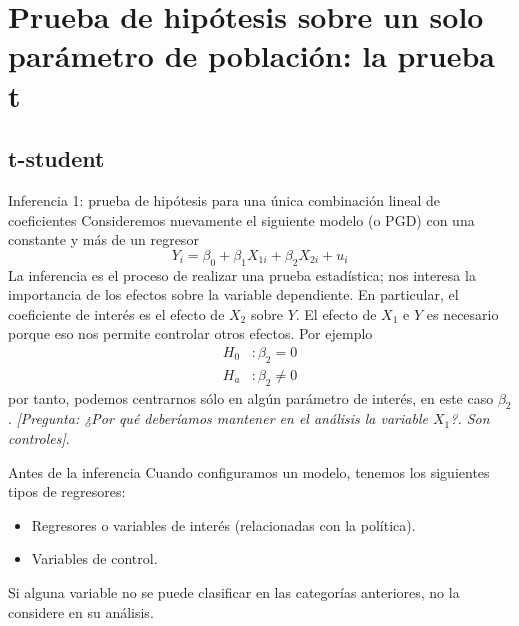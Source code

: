 \section{Prueba de hipótesis sobre un solo parámetro de población: la prueba t}

\subsection{t-student}

\begin{frame}{Inferencia 1: prueba de hipótesis para una única combinación lineal de coeficientes}
	Consideremos nuevamente el siguiente modelo (o PGD) con una constante y más de un regresor
		$$Y_i = \beta_0 + \beta_1 X_{1i} + \beta_2X_{2i} + u_i$$
	La inferencia es el proceso de realizar una prueba estadística; nos interesa la importancia de los efectos sobre la variable dependiente. En particular, el coeficiente de interés es el efecto de $X_2$ sobre $Y$. El efecto de $X_1$ e $Y$ es necesario porque eso nos permite controlar otros efectos. Por ejemplo
		\begin{align*}
			H_0 & : \beta_2 = 0\\
			H_a & : \beta_2 \neq 0
		\end{align*}
	por tanto, podemos centrarnos sólo en algún parámetro de interés, en este caso $\beta_2$. \textit{[Pregunta: ¿Por qué deberíamos mantener en el análisis la variable $X_1$?. Son controles]}.
\end{frame}
\begin{frame}{Antes de la inferencia}
	Cuando configuramos un modelo, tenemos los siguientes tipos de regresores:
		\begin{itemize}
			\item Regresores o variables de interés (relacionadas con la política).
			\item Variables de control.
		\end{itemize}
	Si alguna variable no se puede clasificar en las categorías anteriores, no la considere en su análisis.
\end{frame}
